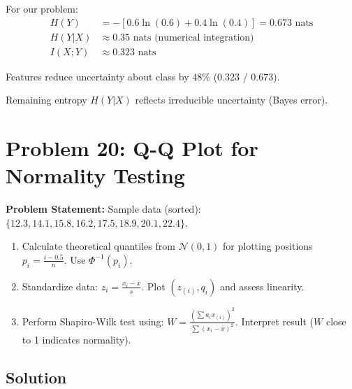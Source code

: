 \documentclass[12pt]{article}
\begin{document}
\begin{explanation}
For our problem:
\begin{align*}
H(Y) &= -[0.6 \ln(0.6) + 0.4 \ln(0.4)] = 0.673 \text{ nats} \\
H(Y|X) &\approx 0.35 \text{ nats (numerical integration)} \\
I(X;Y) &\approx 0.323 \text{ nats}
\end{align*}

Features reduce uncertainty about class by 48\% (0.323 / 0.673).

Remaining entropy $H(Y|X)$ reflects irreducible uncertainty (Bayes error).

\end{explanation}

\newpage
\section{Problem 20: Q-Q Plot for Normality Testing}

\textbf{Problem Statement:} Sample data (sorted): $\{12.3, 14.1, 15.8, 16.2, 17.5, 18.9, 20.1, 22.4\}$.

\begin{enumerate}
\item[(a)] Calculate theoretical quantiles from $\mathcal{N}(0,1)$ for plotting positions $p_i = \frac{i-0.5}{n}$. Use $\Phi^{-1}(p_i)$.
\item[(b)] Standardize data: $z_i = \frac{x_i - \bar{x}}{s}$. Plot $(z_{(i)}, q_i)$ and assess linearity.
\item[(c)] Perform Shapiro-Wilk test using: $W = \frac{(\sum a_i x_{(i)})^2}{\sum(x_i - \bar{x})^2}$. Interpret result ($W$ close to 1 indicates normality).
\end{enumerate}

\subsection*{Solution}
\end{document}
